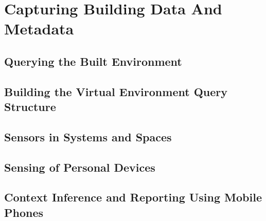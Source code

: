 \chapter{Capturing Building Data And Metadata}

\section{Querying the Built Environment}

\section{Building the Virtual Environment Query Structure}

\section{Sensors in Systems and Spaces}

\section{Sensing of Personal Devices}

\section{Context Inference and Reporting Using Mobile Phones}







